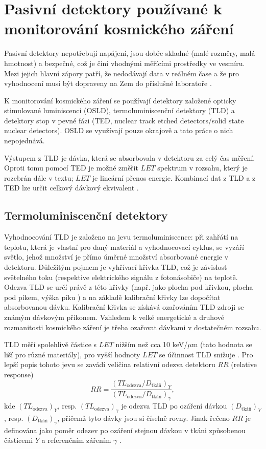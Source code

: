 \chapter{Pasivní detektory používané k monitorování kosmického záření}\label{sec:detektory_detektory}
Pasivní detektory nepotřebují napájení, jsou dobře skladné (malé rozměry, malá hmotnost) a bezpečné, což je činí vhodnými měřícími prostředky ve vesmíru. Mezi jejich hlavní zápory patří, že nedodávají data v reálném čase a že pro vyhodnocení musí být dopraveny na Zem do příslušné laboratoře \cite{benton}.

K monitorování kosmického záření se používají detektory založené opticky stimulované luminiscenci (OSLD), termoluminiscenční detektory (TLD) a detektory stop v pevné fázi (TED, nuclear track etched detectors/solid state nuclear detectors). OSLD se využívají pouze okrajově a tato práce o nich nepojednává.

Výstupem z TLD je dávka, která se absorbovala v detektoru za celý čas měření. Oproti tomu pomocí TED je možné změřit $\mathit{LET}$ spektrum v rozsahu, který je rozebrán dále v textu; $\mathit{LET}$ je lineární přenos energie. Kombinací dat z TLD a z TED lze určit celkový dávkový ekvivalent \cite{benton}.
\section{Termoluminiscenční detektory}\label{sec:detektory_TLD}
Vyhodnocování TLD je založeno na jevu termoluminiscence: při zahřátí na teplotu, která je vlastní pro daný materiál a vyhodnocovací cyklus, se vyzáří světlo, jehož množství je přímo úměrné množství absorbované energie v detektoru. Důležitým pojmem je vyhřívací křivka TLD, což je závislost světelného toku (respektive elektrického signálu z fotonásobiče) na teplotě. Odezva TLD se určí právě z této křivky (např. jako plocha pod křivkou, plocha pod píkem, výška píku \cite{dosis}) a na základě kalibrační křivky lze dopočítat absorbovanou dávku. Kalibrační křivka se získává ozařováním TLD zdroji se známým dávkovým příkonem. Vzhledem k velké energetické a druhové rozmanitosti kosmického záření je třeba ozařovat dávkami v dostatečném rozsahu. 

TLD měří spolehlivě částice s $\mathit{LET}$ nižším než cca 10 keV/$\mu$m (tato hodnota se liší pro různé materiály), pro vyšší hodnoty $\mathit{LET}$ se účinnost TLD snižuje \cite{passDetectors}. Pro lepší popis tohoto jevu se zavádí veličina relativní odezva detektoru $\mathit{RR}$ (relative response)
\begin{equation}
  \mathit{RR}=\frac{\left(TL_{\text{odezva}}/D_{\text{tkáň}}\right)_Y}{\left(TL_{\text{odezva}}/D_{\text{tkáň}}\right)_{\gamma}},
  \label{eq:detektory_TLD_RR}
\end{equation}
kde $(TL_{\text{odezva}})_Y$, resp. $(TL_{\text{odezva}})_{\gamma}$ je odezva TLD po ozáření dávkou $(D_{\text{tkáň}})_Y$, resp. $(D_{\text{tkáň}})_{\gamma}$, přičemž tyto dávky jsou si číselně rovny. Jinak řečeno $\mathit{RR}$ je definována jako poměr odezev po ozáření stejnou dávkou v tkáni způsobenou částicemi $Y$ a referenčním zářením $\gamma$ \cite{TLD_RR}. 

